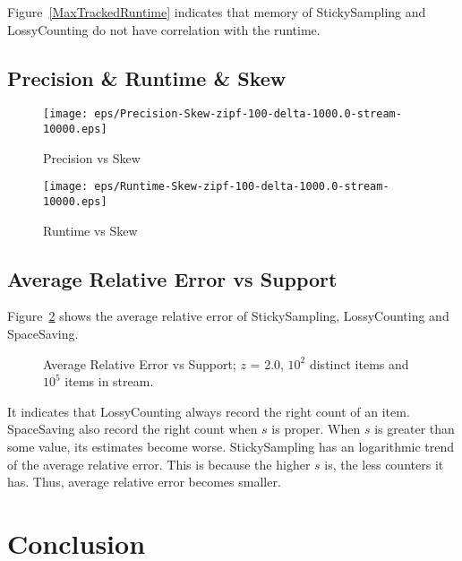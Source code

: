\documentclass[10pt]{article}
\begin{document}
Figure~\ref{MaxTrackedRuntime} indicates that memory of StickySampling and LossyCounting
do not have correlation with the runtime. 

\subsection{Precision \& Runtime \& Skew}

\begin{figure}[H]
      \begin{minipage}{0.48\textwidth}
        \centering
        \texttt{[image: eps/Precision-Skew-zipf-100-delta-1000.0-stream-10000.eps]}
        \caption{Precision vs Skew}
        \label{PrecisionSkew}
      \end{minipage}\hfill
      \begin{minipage}{0.48\textwidth}
        \centering
        \texttt{[image: eps/Runtime-Skew-zipf-100-delta-1000.0-stream-10000.eps]}
        \caption{Runtime vs Skew}
        \label{RuntimeSkew}
      \end{minipage}
\end{figure}

\subsection{Average Relative Error vs Support}
Figure~\ref{AverageRelativeErrorSupport} shows the average relative error of StickySampling, LossyCounting and SpaceSaving.

 \begin{figure}[H]
      \centering
     \begin{subfigure}[b]{0.6\textwidth}
      \centering
      \end{subfigure}
      \caption{Average Relative Error vs Support; $z$ = 2.0, $10^2$ distinct items and $10^5$ items in stream.}  
      \label{AverageRelativeErrorSupport}
 \end{figure}
It indicates that 
 LossyCounting always record the right count of an item.
 SpaceSaving also record the right count when $s$ is proper. 
 When $s$ is greater than some value, its estimates become worse.
 StickySampling has an logarithmic trend of the average relative error.
 This is because the higher $s$ is, the less counters it has. 
 Thus, average relative error becomes smaller.

 \section{Conclusion}\label{conclusion}

 \clearpage


\end{document}

